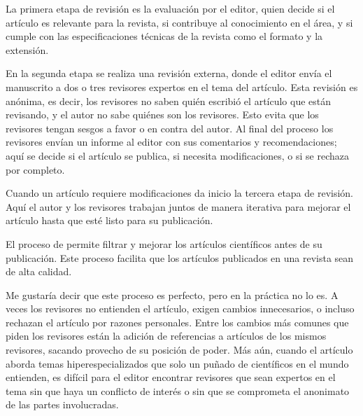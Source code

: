 La primera etapa de revisión es la evaluación por el editor, quien decide si el
artículo es relevante para la revista, si contribuye al conocimiento en el área,
y si cumple con las especificaciones técnicas de la revista como el formato y
la extensión.

En la segunda etapa se realiza una revisión externa, donde el editor envía el
manuscrito a dos o tres revisores expertos en el tema del artículo.
Esta revisión es anónima, es decir, los revisores no saben quién escribió el
artículo que están revisando, y el autor no sabe quiénes son los revisores.
Esto evita que los revisores tengan sesgos a favor o en contra del autor.
Al final del proceso los revisores envían un informe al editor con sus
comentarios y recomendaciones; aquí se decide si el artículo se publica, si
necesita modificaciones, o si se rechaza por completo.

Cuando un artículo requiere modificaciones da inicio la tercera etapa de
revisión.
Aquí el autor y los revisores trabajan juntos de manera iterativa para mejorar
el artículo hasta que esté listo para su publicación.

\begin{remember}
    El proceso de  permite filtrar y mejorar los
    artículos científicos antes de su publicación.
    Este proceso facilita que los artículos publicados en una revista sean de
    alta calidad.
\end{remember}

Me gustaría decir que este proceso es perfecto, pero en la práctica no lo es.
A veces los revisores no entienden el artículo, exigen cambios innecesarios, o
incluso rechazan el artículo por razones personales.
Entre los cambios más comunes que piden los revisores están la adición de
referencias a artículos de los mismos revisores, sacando provecho de su posición
de poder.
Más aún, cuando el artículo aborda temas hiperespecializados que solo un puñado
de científicos en el mundo entienden, es difícil para el editor encontrar
revisores que sean expertos en el tema sin que haya un conflicto de interés o
sin que se comprometa el anonimato de las partes involucradas.


